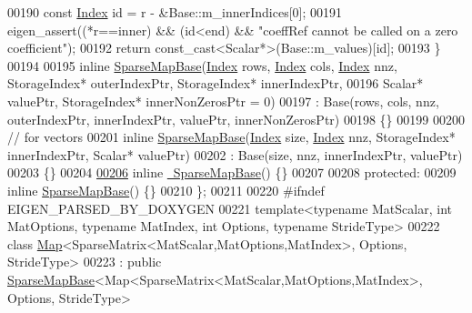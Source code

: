 \begin{DoxyCode}
00190       \textcolor{keyword}{const} \hyperlink{group___core___module_a554f30542cc2316add4b1ea0a492ff02}{Index} \textcolor{keywordtype}{id} = r - &Base::m\_innerIndices[0];
00191       eigen\_assert((*r==inner) && (\textcolor{keywordtype}{id}<end) && \textcolor{stringliteral}{"coeffRef cannot be called on a zero coefficient"});
00192       \textcolor{keywordflow}{return} \textcolor{keyword}{const\_cast<}Scalar*\textcolor{keyword}{>}(Base::m\_values)[\textcolor{keywordtype}{id}];
00193     \}
00194     
00195     \textcolor{keyword}{inline} \hyperlink{class_eigen_1_1_sparse_map_base}{SparseMapBase}(\hyperlink{group___core___module_a554f30542cc2316add4b1ea0a492ff02}{Index} rows, \hyperlink{group___core___module_a554f30542cc2316add4b1ea0a492ff02}{Index} cols, \hyperlink{group___core___module_a554f30542cc2316add4b1ea0a492ff02}{Index} nnz, StorageIndex* 
      outerIndexPtr, StorageIndex* innerIndexPtr,
00196                          Scalar* valuePtr, StorageIndex* innerNonZerosPtr = 0)
00197       : Base(rows, cols, nnz, outerIndexPtr, innerIndexPtr, valuePtr, innerNonZerosPtr)
00198     \{\}
00199 
00200     \textcolor{comment}{// for vectors}
00201     \textcolor{keyword}{inline} \hyperlink{class_eigen_1_1_sparse_map_base}{SparseMapBase}(\hyperlink{group___core___module_a554f30542cc2316add4b1ea0a492ff02}{Index} size, \hyperlink{group___core___module_a554f30542cc2316add4b1ea0a492ff02}{Index} nnz, StorageIndex* innerIndexPtr, Scalar*
       valuePtr)
00202       : Base(size, nnz, innerIndexPtr, valuePtr)
00203     \{\}
00204 
\hyperlink{group___sparse_core___module_a4dfbcf3ac411885b1710ad04892c984d}{00206}     \textcolor{keyword}{inline} \hyperlink{group___sparse_core___module_a4dfbcf3ac411885b1710ad04892c984d}{~SparseMapBase}() \{\}
00207 
00208   \textcolor{keyword}{protected}:
00209     \textcolor{keyword}{inline} \hyperlink{class_eigen_1_1_sparse_map_base}{SparseMapBase}() \{\}
00210 \};
00211 
00220 \textcolor{preprocessor}{#ifndef EIGEN\_PARSED\_BY\_DOXYGEN}
00221 \textcolor{keyword}{template}<\textcolor{keyword}{typename} MatScalar, \textcolor{keywordtype}{int} MatOptions, \textcolor{keyword}{typename} MatIndex, \textcolor{keywordtype}{int} Options, \textcolor{keyword}{typename} Str\textcolor{keywordtype}{id}eType>
00222 \textcolor{keyword}{class }\hyperlink{group___core___module_class_eigen_1_1_map}{Map}<SparseMatrix<MatScalar,MatOptions,MatIndex>, Options, StrideType>
00223   : \textcolor{keyword}{public} \hyperlink{class_eigen_1_1_sparse_map_base}{SparseMapBase}<Map<SparseMatrix<MatScalar,MatOptions,MatIndex>, Options, StrideType>

\end{DoxyCode}
